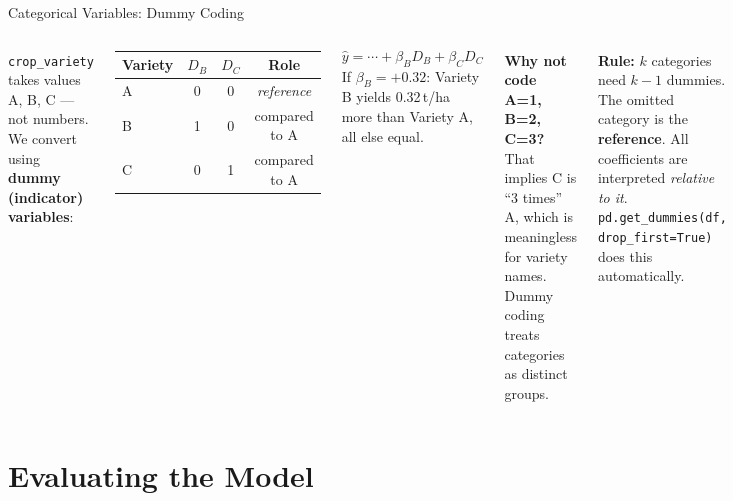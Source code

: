 \documentclass[aspectratio=169,10pt]{beamer}
\begin{document}
\begin{frame}{Categorical Variables: Dummy Coding}
  \begin{columns}
      \texttt{crop\_variety} takes values A, B, C --- not numbers.\\
      We convert using \textbf{dummy (indicator) variables}:
      \vspace{0.3cm}
      \begin{center}
      \small
      \begin{tabular}{lccc}
        \toprule
        Variety & $D_B$ & $D_C$ & Role \\
        \midrule
        A & 0 & 0 & \textit{reference} \\
        B & 1 & 0 & compared to A \\
        C & 0 & 1 & compared to A \\
        \bottomrule
      \end{tabular}
      \end{center}
      \vspace{0.3cm}
      \[
        \hat{y} = \cdots + \beta_B D_B + \beta_C D_C
      \]
      If $\beta_B = +0.32$: Variety B yields 0.32\,t/ha more than Variety A,
      all else equal.
      \begin{tcolorbox}[mybox]
        \small\textbf{Why not code A=1, B=2, C=3?}\\[4pt]
        That implies C is ``3 times'' A, which is meaningless for variety names.
        Dummy coding treats categories as distinct groups.
      \end{tcolorbox}
      \vspace{0.3cm}
      \begin{tcolorbox}[keybox]
        \small\textbf{Rule:} $k$ categories need $k-1$ dummies.\\[4pt]
        The omitted category is the \textbf{reference}. All coefficients
        are interpreted \textit{relative to it}.\\[4pt]
        \texttt{pd.get\_dummies(df, drop\_first=True)} does this automatically.
      \end{tcolorbox}
  \end{columns}
\end{frame}

\section{Evaluating the Model}
\end{document}
